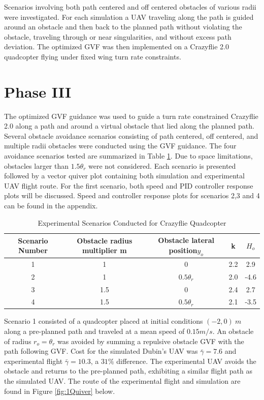 \documentclass[numbered,pdftex]{ohio-etd}
\begin{document}
Scenarios involving both path centered and off centered obstacles of various radii were investigated. For each simulation a UAV traveling along the path is guided around an obstacle and then back to the planned path without violating the obstacle, traveling through or near singularities, and without excess path deviation. The optimized GVF was then implemented on a Crazyflie 2.0 quadcopter flying under fixed wing turn rate constraints. 



\section{Phase III}

The optimized GVF guidance was used to guide a turn rate constrained Crazyflie 2.0 along a path and around a virtual obstacle that lied along the planned path. Several obstacle avoidance scenarios consisting of path centered, off centered, and multiple radii obstacles were conducted using the GVF guidance. The four avoidance scenarios tested are summarized in Table \ref{table:flightScenarios}. Due to space limitations, obstacles larger than $1.5 \theta_r$ were not considered. Each scenario is presented followed by a vector quiver plot containing both simulation and experimental UAV flight route. For the first scenario, both speed and PID controller response plots will be discussed. Speed and controller response plots for scenarios 2,3 and 4 can be found in the appendix. 


\begin{table}[H]
	\centering
	\caption{Experimental Scenarios Conducted for Crazyflie Quadcopter}
	\label{table:flightScenarios}
	\begin{tabular}{|c|c|c|c|c|}
		\hline
		Scenario Number & Obstacle radius multiplier m   & Obstacle lateral position$y_o$             & k   & $H_o$ \\ \hline
		1               & 1   & 0              & 2.2 & 2.9   \\ \hline
		2               & 1   & $0.5 \theta_r$ & 2.0 & -4.6  \\ \hline
		3               & 1.5 & 0              & 2.4 & 2.7   \\ \hline
		4               & 1.5 & $0.5 \theta_r$ & 2.1 & -3.5  \\ \hline
	\end{tabular}
\end{table}


Scenario 1 consisted of a quadcopter placed at initial conditions $(-2,0) \ m$ along a pre-planned path and traveled at a mean speed of $0.15 m/s$. An obstacle of radius $r_o = \theta_r$ was avoided by summing a repulsive obstacle GVF with the path following GVF. Cost for the simulated Dubin's UAV was $\bar{\gamma} = 7.6$ and experimental flight $\bar{\gamma} = 10.3$, a $31 \%$ difference. The experimental UAV avoids the obstacle and returns to the pre-planned path, exhibiting a similar flight path as the simulated UAV. The route of the experimental flight and simulation are found in Figure \ref{fig:1Quiver} below.
\end{document}

